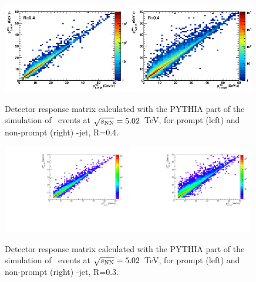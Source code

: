 \begin{figure}[bth]
\centering
\includegraphics[width=0.49\textwidth]{pPbplots/ResponseMatrix/DetMatrix_Dpt0_100}
\includegraphics[width=0.49\textwidth]{pPbplots/ResponseMatrix/DetMatrix_Dpt0_100_FD}
\caption{Detector response matrix calculated with the PYTHIA part of the simulation of \pPb\ events at $\sqrt{s_{\rm NN}}=5.02$~TeV, for prompt (left) and non-prompt (right) \Dstar-jet, R=0.4.}
\label{fig:fRMdet_pPb}
\end{figure}


\begin{figure}[bth]
\centering
\includegraphics[width=0.49\textwidth]{pPbplotsD0/Default/ResponseMatrix/DetMatrix_prompt_Dpt3_36.pdf}
\includegraphics[width=0.49\textwidth]{pPbplotsD0/Default/ResponseMatrix/DetMatrix_nonPrompt_Dpt3_36.pdf}
\caption{Detector response matrix calculated with the PYTHIA part of the simulation of \pPb\ events at $\sqrt{s_{\rm NN}}=5.02$~TeV, for prompt (left) and non-prompt (right) \Dzero-jet, R=0.3.}
\label{fig:fRMdet_pPb_Dzero}
\end{figure}

